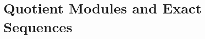 \section{Quotient Modules and Exact Sequences}

\begin{exercise}
    \td \\
\end{exercise}

\begin{solution}
    \td \\
\end{solution}

\begin{exercise}
    \td \\
\end{exercise}

\begin{solution}
    \td \\
\end{solution}

\begin{exercise}
    \td \\
\end{exercise}

\begin{solution}
    \td \\
\end{solution}

\begin{exercise}
    \td \\
\end{exercise}

\begin{solution}
    \td \\
\end{solution}

\begin{exercise}
    \td \\
\end{exercise}

\begin{solution}
    \td \\
\end{solution}

\begin{exercise}
    \td \\
\end{exercise}

\begin{solution}
    \td \\
\end{solution}